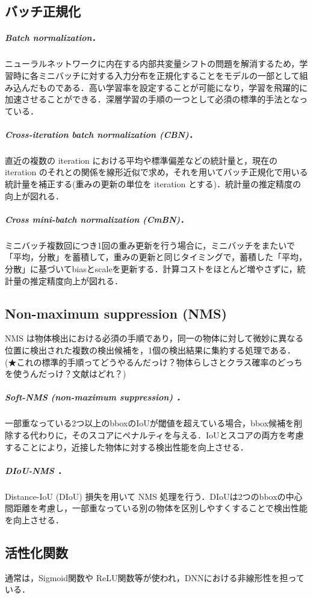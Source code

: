 \documentclass[twocolumn]{jsarticle} %
\begin{document}
\subsection{バッチ正規化}
\subparagraph{Batch normalization\cite{IoffeSzege15}．} ニューラルネットワークに内在する内部共変量シフトの問題を解消するため，学習時に各ミニバッチに対する入力分布を正規化することをモデルの一部として組み込んだものである．高い学習率を設定することが可能になり，学習を飛躍的に加速させることができる．深層学習の手順の一つとして必須の標準的手法となっている．

\subparagraph{Cross-iteration batch normalization (CBN)\cite{YCZHL20}．}直近の複数の iteration における平均や標準偏差などの統計量と，現在の iteration のそれとの関係を線形近似で求め，それを用いてバッチ正規化で用いる統計量を補正する(重みの更新の単位を iteration とする)．統計量の推定精度の向上が図れる．

\subparagraph{Cross mini-batch normalization (CmBN)\cite{BWL20}．} ミニバッチ複数回につき1回の重み更新を行う場合に，ミニバッチをまたいで「平均，分散」を蓄積して，重みの更新と同じタイミングで，蓄積した「平均，分散」に基づいてbiasとscaleを更新する．計算コストをほとんど増やさずに，統計量の推定精度向上が図れる．

\subsection{Non-maximum suppression (NMS)}
NMS は物体検出における必須の手順であり，同一の物体に対して微妙に異なる位置に検出された複数の検出候補を，1個の検出結果に集約する処理である．
(★これの標準的手順ってどうやるんだっけ？物体らしさとクラス確率のどっちを使うんだっけ？文献はどれ？)

\subparagraph{Soft-NMS (non-maximum suppression) \cite{BSCD17}．} 一部重なっている2つ以上のbboxのIoUが閾値を超えている場合，bbox候補を削除する代わりに，そのスコアにペナルティを与える．IoUとスコアの両方を考慮することにより，近接した物体に対する検出性能を向上させる．

\subparagraph{DIoU-NMS \cite{ZWLLYR20}．} Distance-IoU (DIoU) 損失を用いて NMS 処理を行う．DIoUは2つのbboxの中心間距離を考慮し，一部重なっている別の物体を区別しやすくすることで検出性能を向上させる．

\subsection{活性化関数}
通常は，Sigmoid関数\cite{RHW86}や ReLU関数\cite{NaiHin10}等が使われ，DNNにおける非線形性を担っている．
\end{document}
